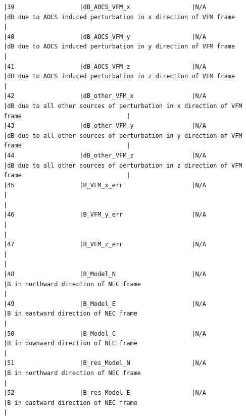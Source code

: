 \begin{verbatim}
|39                  |dB_AOCS_VFM_x                 |N/A                           |dB due to AOCS induced perturbation in x direction of VFM frame                                     |
|40                  |dB_AOCS_VFM_y                 |N/A                           |dB due to AOCS induced perturbation in y direction of VFM frame                                     |
|41                  |dB_AOCS_VFM_z                 |N/A                           |dB due to AOCS induced perturbation in z direction of VFM frame                                     |
|42                  |dB_other_VFM_x                |N/A                           |dB due to all other sources of perturbation in x direction of VFM frame                             |
|43                  |dB_other_VFM_y                |N/A                           |dB due to all other sources of perturbation in y direction of VFM frame                             |
|44                  |dB_other_VFM_z                |N/A                           |dB due to all other sources of perturbation in z direction of VFM frame                             |
|45                  |B_VFM_x_err                   |N/A                           |                                                                                                    |
|46                  |B_VFM_y_err                   |N/A                           |                                                                                                    |
|47                  |B_VFM_z_err                   |N/A                           |                                                                                                    |
|48                  |B_Model_N                     |N/A                           |B in northward direction of NEC frame                                                               |
|49                  |B_Model_E                     |N/A                           |B in eastward direction of NEC frame                                                                |
|50                  |B_Model_C                     |N/A                           |B in downward direction of NEC frame                                                                |
|51                  |B_res_Model_N                 |N/A                           |B in northward direction of NEC frame                                                               |
|52                  |B_res_Model_E                 |N/A                           |B in eastward direction of NEC frame                                                                |

\end{verbatim}
